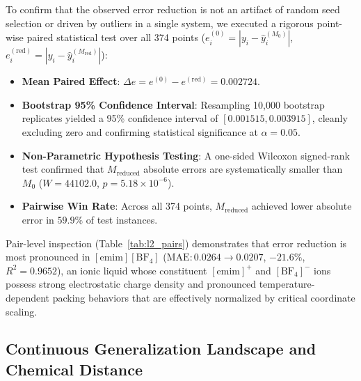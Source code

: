 To confirm that the observed error reduction is not an artifact of random seed selection or driven by outliers in a single system, we executed a rigorous point-wise paired statistical test over all 374 points ($e_i^{(0)} = |y_i - \hat{y}_i^{(M_0)}|$, $e_i^{(\mathrm{red})} = |y_i - \hat{y}_i^{(M_{\mathrm{red}})}|$):
\begin{itemize}
    \item \textbf{Mean Paired Effect}: $\Delta e = e^{(0)} - e^{(\mathrm{red})} = 0.002724$.
    \item \textbf{Bootstrap 95\% Confidence Interval}: Resampling 10,000 bootstrap replicates yielded a 95\% confidence interval of $[0.001515, 0.003915]$, cleanly excluding zero and confirming statistical significance at $\alpha = 0.05$.
    \item \textbf{Non-Parametric Hypothesis Testing}: A one-sided Wilcoxon signed-rank test confirmed that $M_{\mathrm{reduced}}$ absolute errors are systematically smaller than $M_0$ ($W = 44102.0$, $p = 5.18 \times 10^{-6}$).
    \item \textbf{Pairwise Win Rate}: Across all 374 points, $M_{\mathrm{reduced}}$ achieved lower absolute error in $59.9\%$ of test instances.
\end{itemize}

Pair-level inspection (Table~\ref{tab:l2_pairs}) demonstrates that error reduction is most pronounced in $[\text{emim}][\text{BF}_4]$ ($\text{MAE}: 0.0264 \to 0.0207$, $-21.6\%$, $R^2 = 0.9652$), an ionic liquid whose constituent $[\text{emim}]^+$ and $[\text{BF}_4]^-$ ions possess strong electrostatic charge density and pronounced temperature-dependent packing behaviors that are effectively normalized by critical coordinate scaling.

\subsection{Continuous Generalization Landscape and Chemical Distance}
\label{subsec:continuous_landscape}

